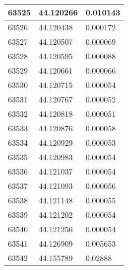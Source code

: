 \documentclass[a4paper,9pt]{beamer}
\begin{document}
{\begin{table}[htbp]
\begin{minipage}{0.5\linewidth}
\begin{tabular}{|l|l|l|}
63525&44.120266&0.010143\\
\hline
63526&44.120438&0.000172\\
\hline
63527&44.120507&0.000069\\
\hline
\cellcolor{green}63528&44.120595&0.000088\\
\hline
\cellcolor{green}63529&44.120661&0.000066\\
\hline
\cellcolor{green}63530&44.120715&\cellcolor{blue}0.000054\\
\hline
\cellcolor{green}63531&44.120767&0.000052\\
\hline
\cellcolor{green}63532&44.120818&0.000051\\
\hline
\cellcolor{green}63533&44.120876&0.000058\\
\hline
\cellcolor{green}63534&44.120929&0.000053\\
\hline
\cellcolor{green}63535&44.120983&0.000054\\
\hline
\cellcolor{green}63536&44.121037&0.000054\\
\hline
\cellcolor{green}63537&44.121093&0.000056\\
\hline
\cellcolor{green}63538&44.121148&0.000055\\
\hline
\cellcolor{green}63539&44.121202&0.000054\\
\hline
63540&44.121256&0.000054\\
\hline
63541&44.126909&0.005653\\
\hline
63542&44.155789&0.02888\\


\end{tabular}
\end{minipage}
\end{table}}
\end{document}
